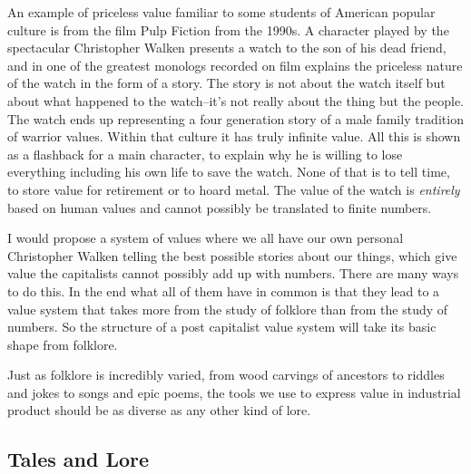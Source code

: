 An example of priceless value familiar to some students of American
popular culture is from the film Pulp Fiction from the 1990s. A
character played by the spectacular Christopher Walken presents a watch
to the son of his dead friend, and in one of the greatest monologs
recorded on film explains the priceless nature of the watch in the form
of a story. The story is not about the watch itself but about what
happened to the watch--it's not really about the thing but the people.
The watch ends up representing a four generation story of a male family
tradition of warrior values. Within that culture it has truly infinite
value. All this is shown as a flashback for a main character, to explain
why he is willing to lose everything including his own life to save the
watch. None of that is to tell time, to store value for retirement or to
hoard metal. The value of the watch is \emph{entirely} based on human
values and cannot possibly be translated to finite numbers.

I would propose a system of values where we all have our own personal
Christopher Walken telling the best possible stories about our things,
which give value the capitalists cannot possibly add up with numbers.
There are many ways to do this. In the end what all of them have in
common is that they lead to a value system that takes more from the
study of folklore than from the study of numbers. So the structure of a
post capitalist value system will take its basic shape from folklore.

Just as folklore is incredibly varied, from wood carvings of ancestors
to riddles and jokes to songs and epic poems, the tools we use to
express value in industrial product should be as diverse as any other
kind of lore.

\subsection{Tales and Lore}\label{tales-and-lore}

